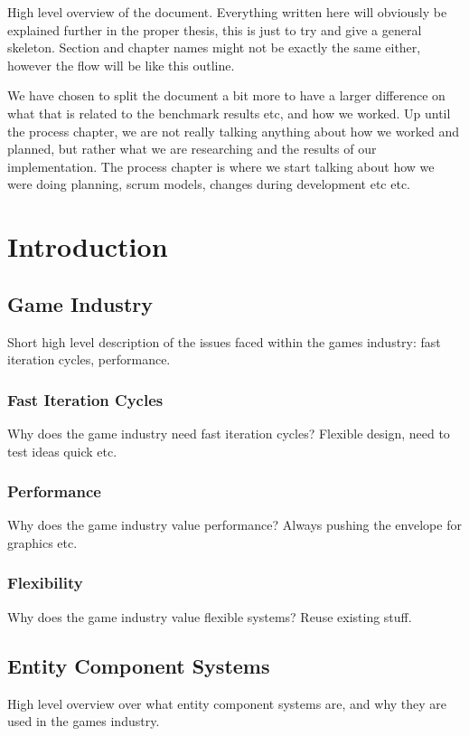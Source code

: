 High level overview of the document.
Everything written here will obviously be explained further in the proper thesis, this is just to try and give a general skeleton.
Section and chapter names might not be exactly the same either,
however the flow will be like this outline.

We have chosen to split the document a bit more to have a larger difference on what
that is related to the benchmark results etc, and how we worked.
Up until the process chapter, we are not really talking anything about how we worked and planned,
but rather what we are researching and the results of our implementation.
The process chapter is where we start talking about how we were doing planning,
scrum models, changes during development etc etc.

\chapter{Introduction}
\label{chap:introduction}

\section{Game Industry}
Short high level description of the issues faced within the games industry: fast iteration cycles, performance.

\subsection{Fast Iteration Cycles}
Why does the game industry need fast iteration cycles?
Flexible design, need to test ideas quick etc.

\subsection{Performance}
Why does the game industry value performance?
Always pushing the envelope for graphics etc.

\subsection{Flexibility}
Why does the game industry value flexible systems?
Reuse existing stuff.

\section{Entity Component Systems}
High level overview over what entity component systems are, and why they are used in the games industry.


